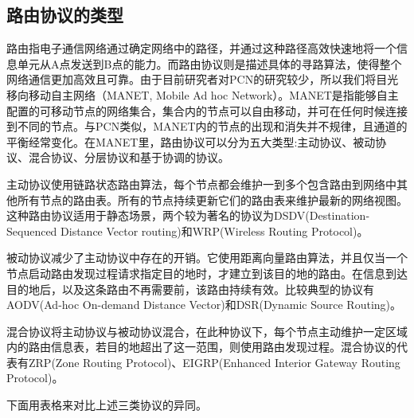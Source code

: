 \documentclass[12pt,a4paper]{article}
\begin{document}
\subsection{路由协议的类型}
路由指电子通信网络通过确定网络中的路径，并通过这种路径高效快速地将一个信息单元从A点发送到B点的能力\cite{medhi2017network}。而路由协议则是描述具体的寻路算法，使得整个网络通信更加高效且可靠。由于目前研究者对PCN的研究较少，所以我们将目光移向移动自主网络（MANET, Mobile Ad hoc Network）。MANET是指能够自主配置的可移动节点的网络集合，集合内的节点可以自由移动，并可在任何时候连接到不同的节点。与PCN类似，MANET内的节点的出现和消失并不规律，且通道的平衡经常变化。在MANET里，路由协议可以分为五大类型:主动协议、被动协议、混合协议、分层协议和基于协调的协议。

主动协议\cite{Alslaim2014}使用链路状态路由算法，每个节点都会维护一到多个包含路由到网络中其他所有节点的路由表。所有的节点持续更新它们的路由表来维护最新的网络视图。这种路由协议适用于静态场景，两个较为著名的协议为DSDV(Destination-Sequenced Distance Vector routing)和WRP(Wireless Routing Protocol)\cite{Murthy1996}。

被动协议减少了主动协议中存在的开销。它使用距离向量路由算法，并且仅当一个节点启动路由发现过程请求指定目的地时，才建立到该目的地的路由。在信息到达目的地后，以及这条路由不再需要前，该路由持续有效。比较典型的协议有AODV(Ad-hoc On-demand Distance Vector)和DSR(Dynamic Source Routing)\cite{Johnson, Perkins1999}。

混合协议将主动协议与被动协议混合，在此种协议下，每个节点主动维护一定区域内的路由信息表，若目的地超出了这一范围，则使用路由发现过程。混合协议的代表有ZRP(Zone Routing Protocol)、EIGRP(Enhanced Interior Gateway Routing Protocol)。

下面用表格来对比上述三类协议的异同。
\end{document}

